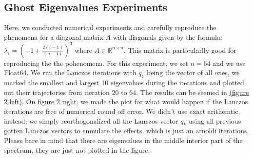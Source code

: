 \documentclass[]{article}
\theoremstyle{definition}
\begin{document}
        \subsection{Ghost Eigenvalues Experiments}
            Here, we conducted numerical experiments and carefully reproduce the phenomena for a diagonal matrix $A$ with diagonals given by the formula: $\lambda_i = \left(-1 + \frac{2(i - 1)}{(n - 1)}\right)^3$ where $A\in \mathbb R^{n\times n}$. This matrix is particularlly good for reproducing the the pohenomena. For this experiment, we set $n = 64$ and we use Float64. We run the Lanczos iterations with $q_1$ being the vector of all ones, we marked the smallest and largest 10 eigenvalues during the iterations and plotted out their trajectories from iteration 20 to 64. The results can be seemed in \hyperref[fig:2]{(figure 2 left)}. On \hyperref[fig:2]{figure 2 right}, we made the plot for what would happen if the Lanczos iterations are free of numerical round off error. We didn't use exact arithemtic, instead, we simply reorthogonalized all the Lanczos vector $q_k$ using all previous gotten Lanczos vectors to enmulate the effects, which is just an arnoldi iterations. Please bare in mind that there are eigenvalues in the middle interior part of the spectrum, they are just not plotted in the figure. 
\end{document}

